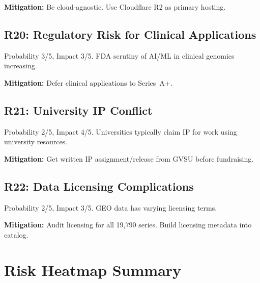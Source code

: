 \documentclass[10pt,twocolumn,letterpaper]{article}
\begin{document}
\textbf{Mitigation:} Be cloud-agnostic. Use Cloudflare R2 as primary hosting.

\subsection{R20: Regulatory Risk for Clinical Applications}

Probability 3/5, Impact 3/5. FDA scrutiny of AI/ML in clinical genomics
increasing.

\textbf{Mitigation:} Defer clinical applications to Series~A+.

\subsection{R21: University IP Conflict}

Probability 2/5, Impact 4/5. Universities typically claim IP for work using
university resources.

\textbf{Mitigation:} Get written IP assignment/release from GVSU before
fundraising.

\subsection{R22: Data Licensing Complications}

Probability 2/5, Impact 3/5. GEO data has varying licensing terms.

\textbf{Mitigation:} Audit licensing for all 19,790 series. Build licensing
metadata into catalog.

\section{Risk Heatmap Summary}
\label{sec:heatmap}
\end{document}
